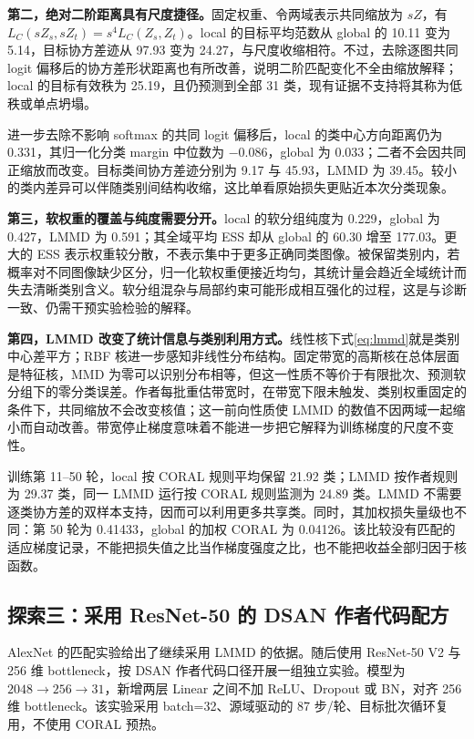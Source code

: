 \textbf{第二，绝对二阶距离具有尺度捷径。}固定权重、令两域表示共同缩放为 $sZ$，有 $L_C(sZ_s,sZ_t)=s^4L_C(Z_s,Z_t)$。local 的目标平均范数从 global 的 10.11 变为 5.14，目标协方差迹从 97.93 变为 24.27，与尺度收缩相符。不过，去除逐图共同 logit 偏移后的协方差形状距离也有所改善，说明二阶匹配变化不全由缩放解释；local 的目标有效秩为 25.19，且仍预测到全部 31 类，现有证据不支持将其称为低秩或单点坍塌。

进一步去除不影响 softmax 的共同 logit 偏移后，local 的类中心方向距离仍为 0.331，其归一化分类 margin 中位数为 $-0.086$，global 为 0.033；二者不会因共同正缩放而改变。目标类间协方差迹分别为 9.17 与 45.93，LMMD 为 39.45。较小的类内差异可以伴随类别间结构收缩，这比单看原始损失更贴近本次分类现象。

\textbf{第三，软权重的覆盖与纯度需要分开。}local 的软分组纯度为 0.229，global 为 0.427，LMMD 为 0.591；其全域平均 ESS 却从 global 的 60.30 增至 177.03。更大的 ESS 表示权重较分散，不表示集中于更多正确同类图像。被保留类别内，若概率对不同图像缺少区分，归一化软权重便接近均匀，其统计量会趋近全域统计而失去清晰类别含义。软分组混杂与局部约束可能形成相互强化的过程，这是与诊断一致、仍需干预实验检验的解释。

\textbf{第四，LMMD 改变了统计信息与类别利用方式。}线性核下式\eqref{eq:lmmd}就是类别中心差平方；RBF 核进一步感知非线性分布结构。固定带宽的高斯核在总体层面是特征核，MMD 为零可以识别分布相等\cite{gretton2012kernel}，但这一性质不等价于有限批次、预测软分组下的零分类误差。作者每批重估带宽时，在带宽下限未触发、类别权重固定的条件下，共同缩放不会改变核值；这一前向性质使 LMMD 的数值不因两域一起缩小而自动改善。带宽停止梯度意味着不能进一步把它解释为训练梯度的尺度不变性。

训练第 11--50 轮，local 按 CORAL 规则平均保留 21.92 类；LMMD 按作者规则为 29.37 类，同一 LMMD 运行按 CORAL 规则监测为 24.89 类。LMMD 不需要逐类协方差的双样本支持，因而可以利用更多共享类。同时，其加权损失量级也不同：第 50 轮为 0.41433，global 的加权 CORAL 为 0.04126。该比较没有匹配的适应梯度记录，不能把损失值之比当作梯度强度之比，也不能把收益全部归因于核函数。

\subsection{探索三：采用 ResNet-50 的 DSAN 作者代码配方}

AlexNet 的匹配实验给出了继续采用 LMMD 的依据。随后使用 ResNet-50 V2 与 256 维 bottleneck，按 DSAN 作者代码口径开展一组独立实验。模型为 $2048\to256\to31$，新增两层 Linear 之间不加 ReLU、Dropout 或 BN，对齐 256 维 bottleneck。该实验采用 batch=32、源域驱动的 87 步/轮、目标批次循环复用，不使用 CORAL 预热。

